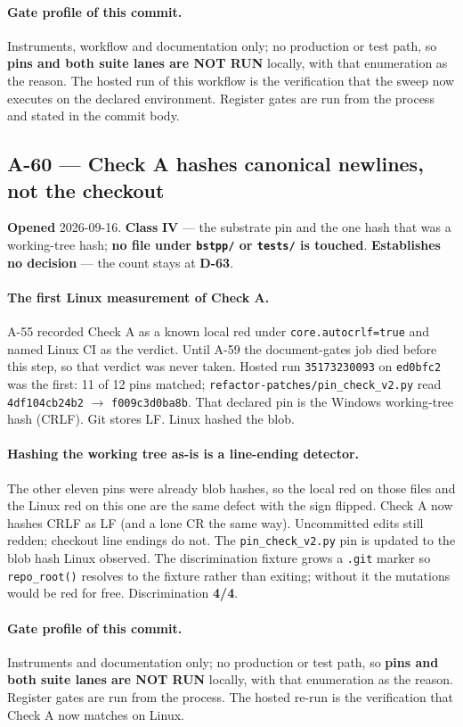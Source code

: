 \documentclass[
  10pt,
]{article}
\begin{document}
\paragraph{Gate profile of this commit.}
Instruments, workflow and documentation only; no production or test path, so
\textbf{pins and both suite lanes are NOT RUN} locally, with that enumeration
as the reason. The hosted run of this workflow is the verification that the
sweep now executes on the declared environment. Register gates are run from
the process and stated in the commit body.

\hypertarget{a-60}{%
\subsection{A-60 --- Check A hashes canonical newlines, not the
checkout}\label{a-60}}

\textbf{Opened} 2026-09-16. \textbf{Class} \textbf{IV} --- the substrate pin
and the one hash that was a working-tree hash; \textbf{no file under
\texttt{bstpp/} or \texttt{tests/} is touched}. \textbf{Establishes no
decision} --- the count stays at \textbf{D-63}.

\paragraph{The first Linux measurement of Check A.}
A-55 recorded Check A as a known local red under \texttt{core.autocrlf=true}
and named Linux CI as the verdict. Until A-59 the document-gates job died
before this step, so that verdict was never taken. Hosted run
\texttt{35173230093} on \texttt{ed0bfc2} was the first: 11 of 12 pins matched;
\texttt{refactor-patches/pin\_check\_v2.py} read
\texttt{4df104cb24b2} $\to$ \texttt{f009c3d0ba8b}. That declared pin is the
Windows working-tree hash (CRLF). Git stores LF. Linux hashed the blob.

\paragraph{Hashing the working tree as-is is a line-ending detector.}
The other eleven pins were already blob hashes, so the local red on those
files and the Linux red on this one are the same defect with the sign
flipped. Check A now hashes CRLF as LF (and a lone CR the same way).
Uncommitted edits still redden; checkout line endings do not.
The \texttt{pin\_check\_v2.py} pin is updated to the blob hash Linux
observed. The discrimination fixture grows a \texttt{.git} marker so
\texttt{repo\_root()} resolves to the fixture rather than exiting; without
it the mutations would be red for free. Discrimination \textbf{4/4}.

\paragraph{Gate profile of this commit.}
Instruments and documentation only; no production or test path, so
\textbf{pins and both suite lanes are NOT RUN} locally, with that enumeration
as the reason. Register gates are run from the process. The hosted re-run is
the verification that Check A now matches on Linux.
\end{document}
